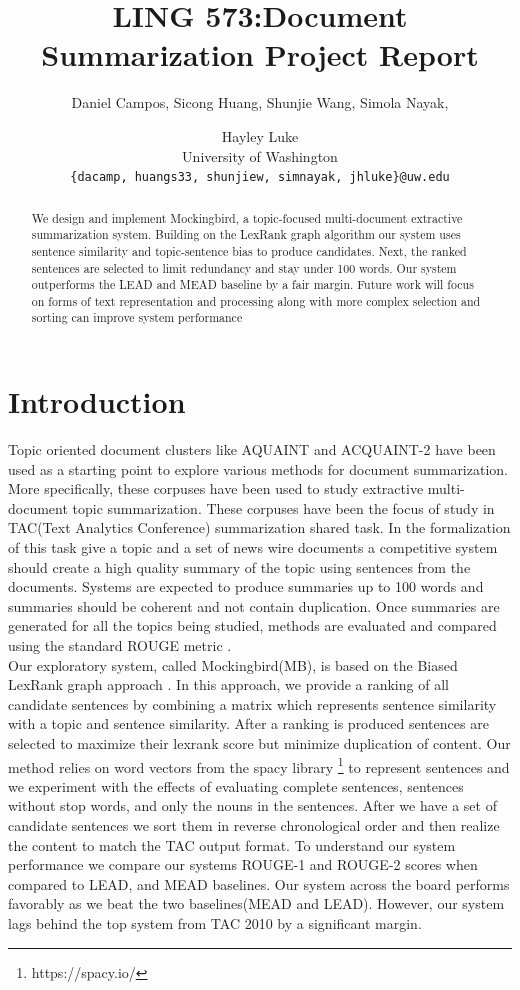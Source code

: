 \documentclass[11pt,a4paper]{article}
\title{LING 573:Document Summarization Project Report}
\author{Daniel Campos, Sicong Huang, Shunjie Wang, Simola Nayak, \and Hayley Luke \\ University of Washington \\ {\tt\{dacamp, huangs33, shunjiew, simnayak, jhluke\}@uw.edu}}
\begin{document}
\maketitle
\begin{abstract}
We design and implement Mockingbird, a topic-focused multi-document extractive summarization system. Building on the LexRank graph algorithm our system uses sentence similarity and topic-sentence bias to produce candidates. Next, the ranked sentences are selected to limit redundancy and stay under 100 words. Our system outperforms the LEAD and MEAD baseline by a fair margin. Future work will focus on forms of text representation and processing along with more complex selection and sorting can improve system performance
\end{abstract}
\section{Introduction}
Topic oriented document clusters like AQUAINT \cite{Graff2002TheAC} and ACQUAINT-2 have been used as a starting point to explore various methods for document summarization. More specifically, these corpuses have been used to study extractive multi-document topic summarization. These corpuses have been the focus of study in TAC(Text Analytics Conference) \cite{Dang2008OverviewOT} summarization shared task. In the formalization of this task give a topic and a set of news wire documents a competitive system should create a high quality summary of the topic using sentences from the documents. Systems are expected to produce summaries up to 100 words and summaries should be coherent and not contain duplication. Once summaries are generated for all the topics being studied, methods are evaluated and compared using the standard ROUGE metric \cite{Lin2004ROUGEAP}.  \\ Our exploratory system, called Mockingbird(MB), is based on the Biased LexRank graph approach \cite{Otterbacher2009BiasedLP}. In this approach, we provide a ranking of all candidate sentences by combining a matrix which represents sentence similarity with a topic and sentence similarity. After a ranking is produced sentences are selected to maximize their lexrank score but minimize duplication of content. Our method relies on word vectors \cite{Mikolov2013DistributedRO} from the spacy library \footnote{https://spacy.io/} to represent sentences and we experiment with the effects of evaluating complete sentences, sentences without stop words, and only the nouns in the sentences. After we have a set of candidate sentences we sort them in reverse chronological order and then realize the content to match the TAC output format. To understand our system performance we compare our systems ROUGE-1 and ROUGE-2 scores when compared to LEAD, and MEAD baselines. Our system across the board performs favorably as we beat the two baselines(MEAD and LEAD). However, our system lags behind the top system from TAC 2010 by a significant margin.
\end{document}
